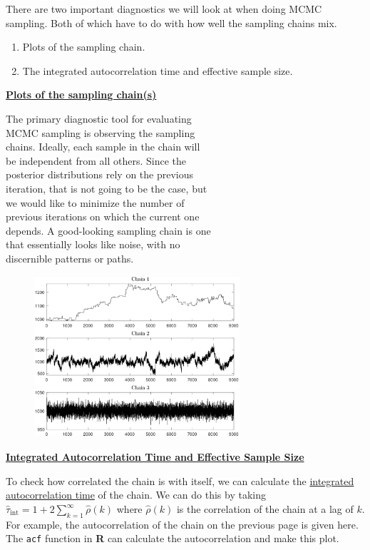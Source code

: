 \documentclass[11pt]{article}
\newcommand{\ub}[1]{{\bf \uline{#1}}}
\newcommand{\ds}{\displaystyle}
\begin{document}

There are two important diagnostics we will look at when doing MCMC sampling. Both of which have to do with how well the sampling chains mix. 
\begin{enumerate}
\item Plots of the sampling chain.
\item The integrated autocorrelation time and effective sample size.
\end{enumerate}

\ub{Plots of the sampling chain(s)}

The primary diagnostic tool for evaluating\\
MCMC sampling is observing the sampling\\
chains. Ideally, each sample in the chain will\\
be independent from all others. Since the\\
posterior distributions rely on the previous\\
iteration, that is not going to be the case, but\\
we would like to minimize the number of\\
previous iterations on which the current one\\
depends. A good-looking sampling chain is one\\
that essentially looks like noise, with no\\
discernible patterns or paths. 
\vspace{-2.4in}
\begin{figure}[H]
\raggedleft
\includegraphics[width=3in]{bayes_figs/chain_example.png}
\end{figure}

\vfill

\ub{Integrated Autocorrelation Time and Effective Sample Size}

To check how correlated the chain is with itself, we can calculate the \uline{integrated autocorrelation time} of the chain. We can do this by taking
$
\ds\hat{\tau}_{\text{int}}=1+2\sum_{k=1}^\infty\hat{\rho}(k)
$
where $\hat{\rho}(k)$ is the correlation of the chain at a lag of $k$. For example, the autocorrelation of the chain on the previous page is given here. The \texttt{acf} function in {\bf R} can calculate the autocorrelation and make this plot.
\end{document}
